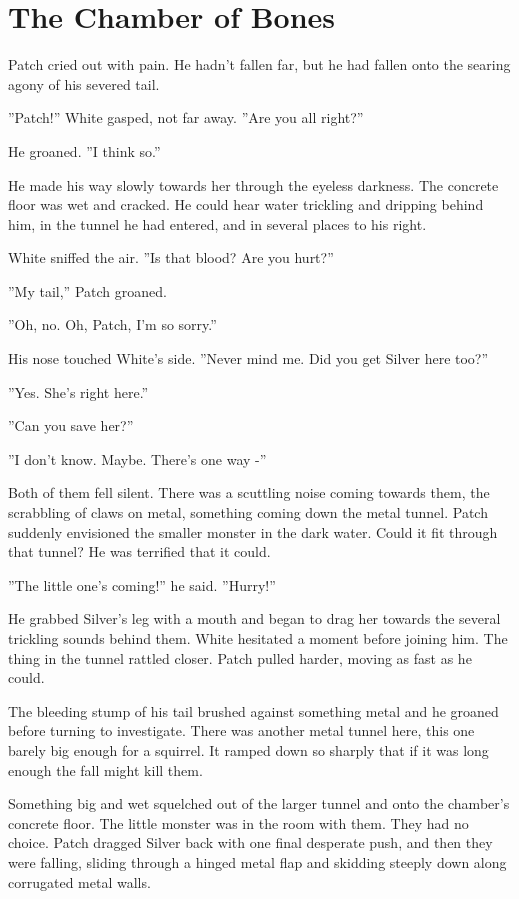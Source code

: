 \documentclass[12pt]{book}
\begin{document}

\section{The Chamber of Bones}

Patch cried out with pain. He hadn't fallen far, but he had fallen onto the searing agony of his severed tail.

''Patch!'' White gasped, not far away. ''Are you all right?''

He groaned. ''I think so.''

He made his way slowly towards her through the eyeless darkness. The concrete floor was wet and cracked. He could hear water trickling and dripping behind him, in the tunnel he had entered, and in several places to his right.

White sniffed the air. ''Is that blood? Are you hurt?''

''My tail,'' Patch groaned.

''Oh, no. Oh, Patch, I'm so sorry.''

His nose touched White's side. ''Never mind me. Did you get Silver here too?''

''Yes. She's right here.''

''Can you save her?''

''I don't know. Maybe. There's one way -''

Both of them fell silent. There was a scuttling noise coming towards them, the scrabbling of claws on metal, something coming down the metal tunnel. Patch suddenly envisioned the smaller monster in the dark water. Could it fit through that tunnel? He was terrified that it could.

''The little one's coming!'' he said. ''Hurry!''

He grabbed Silver's leg with a mouth and began to drag her towards the several trickling sounds behind them. White hesitated a moment before joining him. The thing in the tunnel rattled closer. Patch pulled harder, moving as fast as he could.

The bleeding stump of his tail brushed against something metal and he groaned before turning to investigate. There was another metal tunnel here, this one barely big enough for a squirrel. It ramped down so sharply that if it was long enough the fall might kill them.

Something big and wet squelched out of the larger tunnel and onto the chamber's concrete floor. The little monster was in the room with them. They had no choice. Patch dragged Silver back with one final desperate push, and then they were falling, sliding through a hinged metal flap and skidding steeply down along corrugated metal walls.
\end{document}
